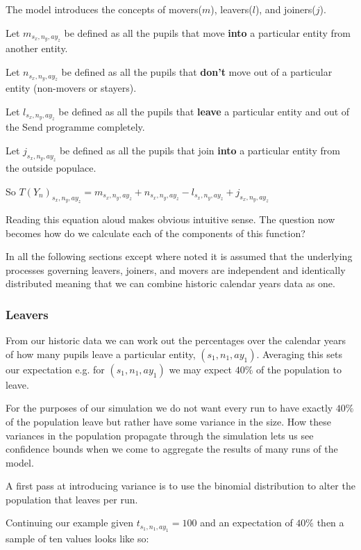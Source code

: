 \documentclass[margin=5mm]{article}
\begin{document}
The model introduces the concepts of movers($m$), leavers($l$), and
joiners($j$).

Let $m_{s_x,n_y,ay_z}$ be defined as all the pupils that move
\textbf{into} a particular entity from another entity.

Let $n_{s_x,n_y,ay_z}$ be defined as all the pupils that
\textbf{don't} move out of a particular entity (non-movers or
stayers).

Let $l_{s_x,n_y,ay_z}$ be defined as all the pupils that
\textbf{leave} a particular entity and out of the Send programme
completely.

Let $j_{s_x,n_y,ay_z}$ be defined as all the pupils that join
\textbf{into} a particular entity from the outside populace.


So $T(Y_n)_{s_x,n_y,ay_z} = m_{s_x,n_y,ay_z} + n_{s_x,n_y,ay_z} -
l_{s_x,n_y,ay_z} + j_{s_x,n_y,ay_z} $

Reading this equation aloud makes obvious intuitive sense.  The
question now becomes how do we calculate each of the components of
this function?

In all the following sections except where noted it is assumed that
the underlying processes governing leavers, joiners, and movers are
independent and identically distributed meaning that we can combine
historic calendar years data as one.

\subsubsection{Leavers}

From our historic data we can work out the percentages over the
calendar years of how many pupils leave a particular entity,
$(s_1,n_1,ay_1)$.  Averaging this sets our expectation e.g. for
$(s_1,n_1,ay_1)$ we may expect $40\%$ of the population to leave.

For the purposes of our simulation we do not want every run to have
exactly $40\%$ of the population leave but rather have some variance
in the size.  How these variances in the population propagate through
the simulation lets us see confidence bounds when we come to
aggregate the results of many runs of the model.

A first pass at introducing variance is to use the binomial
distribution to alter the population that leaves per run.

Continuing our example given $t_{s_1,n_1,ay_1} = 100$ and an
expectation of $40\%$ then a sample of ten values looks like so:
\end{document}
